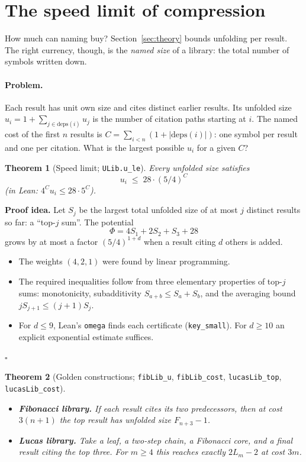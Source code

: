 \documentclass[11pt]{article}
\newtheorem{theorem}{Theorem}
\theoremstyle{remark}
\newcommand{\lean}[1]{\texttt{#1}}
\begin{document}
\section{The speed limit of compression}\label{sec:speed}

How much can naming buy? Section~\ref{sec:theory} bounds unfolding per result. The right
currency, though, is the \emph{named size} of a library: the total number of symbols
written down.

\paragraph{Problem.} Each result has unit own size and cites distinct earlier results.
Its unfolded size $u_i=1+\sum_{j\in\mathrm{deps}(i)}u_j$ is the number of citation paths
starting at $i$. The named cost of the first $n$ results is
$C=\sum_{i<n}(1+|\mathrm{deps}(i)|)$: one symbol per result and one per citation. What is
the largest possible $u_i$ for a given $C$?

\begin{theorem}[Speed limit; \lean{ULib.u\_le}]\label{thm:speed}
Every unfolded size satisfies
\[
u_i\;\le\;28\cdot(5/4)^{C}
\]
(in Lean: $4^{C}u_i\le 28\cdot5^{C}$).
\end{theorem}

\noindent\textbf{Proof idea.} Let $S_j$ be the largest total unfolded size of at most $j$
distinct results so far: a ``top-$j$ sum''. The potential
\[
\Phi=4S_1+2S_2+S_3+28
\]
grows by at most a factor $(5/4)^{1+d}$ when a result citing $d$ others is added.
\begin{itemize}
\item The weights $(4,2,1)$ were found by linear programming.
\item The required inequalities follow from three elementary properties of top-$j$ sums:
  monotonicity, subadditivity $S_{a+b}\le S_a+S_b$, and the averaging bound
  $jS_{j+1}\le(j+1)S_j$.
\item For $d\le 9$, Lean's \lean{omega} finds each certificate (\lean{key\_small}). For
  $d\ge10$ an explicit exponential estimate suffices.
\end{itemize}
\hfill$\square$

\begin{theorem}[Golden constructions; \lean{fibLib\_u}, \lean{fibLib\_cost}, \lean{lucasLib\_top}, \lean{lucasLib\_cost}]
\leavevmode
\begin{itemize}
\item \textbf{Fibonacci library.} If each result cites its two predecessors, then at cost
  $3(n+1)$ the top result has unfolded size $F_{n+3}-1$.
\item \textbf{Lucas library.} Take a leaf, a two-step chain, a Fibonacci core, and a final
  result citing the top three. For $m\ge4$ this reaches exactly $2L_m-2$ at cost $3m$.
\end{itemize}
\end{theorem}
\end{document}
